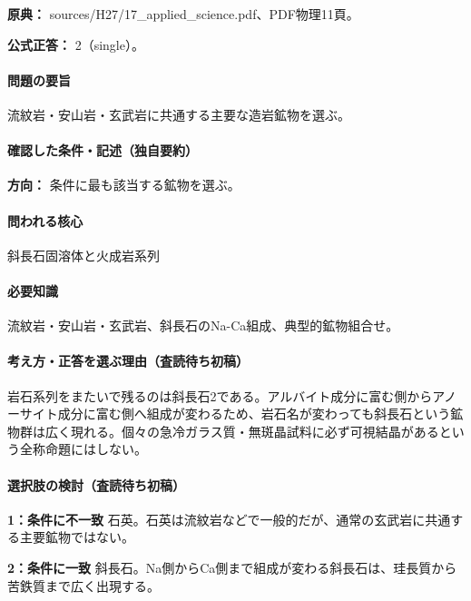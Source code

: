\noindent\textbf{原典：} sources/H27/17\_applied\_science.pdf、PDF物理11頁。

\textbf{公式正答：} 2（single）。

\paragraph{問題の要旨} 流紋岩・安山岩・玄武岩に共通する主要な造岩鉱物を選ぶ。

\paragraph{確認した条件・記述（独自要約）}\mbox{}\par

\noindent\textbf{方向：} 条件に最も該当する鉱物を選ぶ。\par

\paragraph{問われる核心} 斜長石固溶体と火成岩系列

\paragraph{必要知識} 流紋岩・安山岩・玄武岩、斜長石のNa-Ca組成、典型的鉱物組合せ。

\paragraph{考え方・正答を選ぶ理由（査読待ち初稿）} 岩石系列をまたいで残るのは斜長石2である。アルバイト成分に富む側からアノーサイト成分に富む側へ組成が変わるため、岩石名が変わっても斜長石という鉱物群は広く現れる。個々の急冷ガラス質・無斑晶試料に必ず可視結晶があるという全称命題にはしない。

\paragraph{選択肢の検討（査読待ち初稿）}\mbox{}\par

\noindent\textbf{1：条件に不一致} 石英。石英は流紋岩などで一般的だが、通常の玄武岩に共通する主要鉱物ではない。\par

\noindent\textbf{2：条件に一致} 斜長石。Na側からCa側まで組成が変わる斜長石は、珪長質から苦鉄質まで広く出現する。\par

